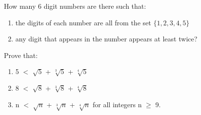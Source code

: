 \item How many 6 digit numbers are there such that:
\begin{enumerate}
\item the digits of each number are all from the set $\{1, 2, 3, 4, 5\}$
\item any digit that appears in the number appears at least twice?
\end{enumerate}

\item Prove that:
\begin{enumerate}
\item 5 $<$ $\sqrt{5}$ + $\sqrt[3]{5}$ + $\sqrt[4]{5}$
\item 8 $<$ $\sqrt{8}$ + $\sqrt[3]{8}$ + $\sqrt[4]{8}$
\item n $<$ $\sqrt{n}$ + $\sqrt[3]{n}$ + $\sqrt[4]{n}$ for all integers n $\geq$ 9.
\end{enumerate}
